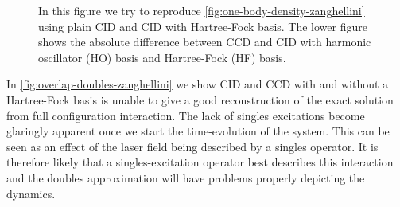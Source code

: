 \begin{figure}
            \caption{In this figure we try to reproduce
            \autoref{fig:one-body-density-zanghellini} using plain CID and CID with
            Hartree-Fock basis.
            The lower figure shows the absolute difference between CCD and CID
            with harmonic oscillator (HO) basis and Hartree-Fock (HF) basis.}
            \label{fig:one-body-density-doubles-zanghellini}
        \end{figure}

        In \autoref{fig:overlap-doubles-zanghellini} we show CID and CCD with
        and without a Hartree-Fock basis is unable to give a good reconstruction
        of the exact solution from full configuration interaction.
        The lack of singles excitations become glaringly apparent once we start
        the time-evolution of the system.
        This can be seen as an effect of the laser field being described by a
        singles operator.
        It is therefore likely that a singles-excitation operator best describes
        this interaction and the doubles approximation will have problems
        properly depicting the dynamics.

